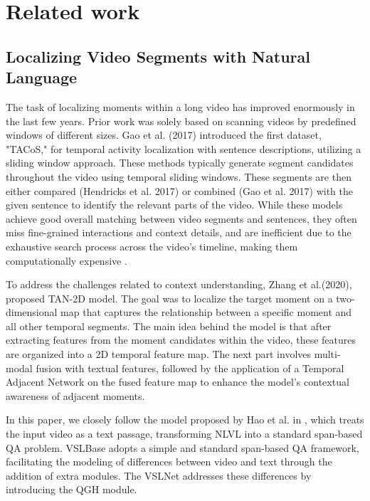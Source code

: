 \documentclass[10pt,twocolumn,letterpaper]{article}
\begin{document}
\section{Related work}

\subsection{Localizing Video Segments with Natural Language}

The task of localizing moments within a long video has improved enormously in the last few years. Prior work was solely based on scanning videos by predefined windows of different sizes. Gao et al. (2017) introduced the first dataset, "TACoS," for temporal activity localization with sentence descriptions, utilizing a sliding window approach. These methods typically generate segment candidates throughout the video using temporal sliding windows. These segments are then either compared (Hendricks et al. 2017) or combined (Gao et al. 2017) with the given sentence to identify the relevant parts of the video. While these models achieve good overall matching between video segments and sentences, they often miss fine-grained interactions and context details, and are inefficient due to the exhaustive search process across the video's timeline, making them computationally expensive \cite{b4}.


To address the challenges related to context understanding, Zhang et al.(2020), proposed TAN-2D model. The goal was to localize the target moment on a two-dimensional map that captures the relationship between a specific moment and all other temporal segments. The main idea behind the model is that after extracting features from the moment candidates within the video, these features are organized into a 2D temporal feature map. The next part involves multi-modal fusion with textual features, followed by the application of a Temporal Adjacent Network on the fused feature map to enhance the model's contextual awareness of adjacent moments.

In this paper, we closely follow the model proposed by Hao et al. in \cite{b3}, which treats the input video as a text passage, transforming NLVL into a standard span-based QA problem. VSLBase adopts a simple and standard span-based QA framework, facilitating the modeling of differences between video and text through the addition of extra modules. The VSLNet addresses these differences by introducing the QGH module.
\end{document}
